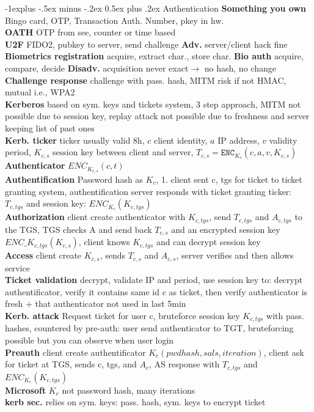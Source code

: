 \documentclass[10pt,landscape]{article}
\makeatletter
\renewcommand{\subsection}{\@startsection{subsection}{2}{0mm}%
                                {-1explus -.5ex minus -.2ex}%
                                {0.5ex plus .2ex}%
                                {\normalfont\normalsize\bfseries}}
\makeatother
\begin{document}
\begin{multicols*}{4}
\subsection{Authentication}
\textbf{Something you own} Bingo card, OTP, Transaction Auth. Number, pkey in hw.\\
\textbf{OATH} OTP from see, counter or time based\\
\textbf{U2F} FIDO2, pubkey to server, send challenge \textbf{Adv.} server/client hack fine\\
\textbf{Biometrics registration} acquire, extract char., store char.
\textbf{Bio auth} acquire, compare, decide
\textbf{Disadv.} acquisition never exact$\rightarrow$ no hash, no change\\
\textbf{Challenge response} challenge with pass. hash, MITM risk if not HMAC, mutual i.e., WPA2\\
\textbf{Kerberos} based on sym. keys and tickets system, 3 step approach, MITM not possible due to session key, replay attack not possible due to freshness and server keeping list of past ones\\
\textbf{Kerb. ticker} ticker usually valid 8h, $c$ client identity, $a$ IP address, $v$ validity period, $K_{c,s}$ session key between client and server, $T_{c,s}=\texttt{ENC}_{K_s}(c,a,v,K_{c,s})$\\
\textbf{Authenticator} $ENC_{K_{c,s}}(c,t)$\\
\textbf{Authentification} Password hash as $K_c$, 1. client sent c, tgs for ticket to ticket granting system, authentification server responds with ticket granting ticker: $T_{c,tgs}$ and session key: $ENC_{K_c}(K_{c,tgs})$\\
\textbf{Authorization} client create authenticator with $K_{c,tgs}$, send $T_{c,tgs}$ and $A_{c,tgs}$ to the TGS, TGS checks A and send back $T_{c,s}$ and an encrypted session key $ENC\_{K_{c,tgs}}(K_{c,s})$, client knows $K_{c,tgs}$ and can decrypt session key\\
\textbf{Access} client create $K_{c,s}$, sends $T_{c,s}$ and $A_{c,s}$, server verifies and then allows service\\
\textbf{Ticket validation} decrypt, validate IP and period, use session key to: decrypt authentificator, verify it contains same id c as ticket, then verify authenticator is fresh + that authenticator not used in last 5min\\
\textbf{Kerb. attack} Request ticket for user c, bruteforce session key $K_{c,tgs}$ with pass. hashes, countered by pre-auth: user send authenticator to TGT, bruteforcing possible but you can observe when user login\\
\textbf{Preauth} client create authentificator $K_c(pwd hash, sals, iteration)$, client ask for ticket at TGS, sends c, tgs, and $A_c$, AS response with $T_{c,tgs}$ and $ENC_{K_c}(K_{c,tgs})$\\
\textbf{Microsoft} $K_c$ not password hash, many iterations\\
\textbf{kerb sec.} relies on sym. keys: pass. hash, sym. keys to encrypt ticket\\

\end{multicols*}
\end{document}
